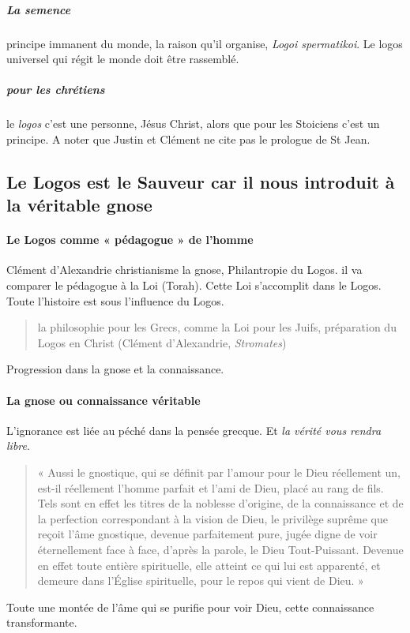       \subparagraph{La semence} principe immanent du monde, la raison qu'il organise, \emph{Logoi spermatikoi}. Le logos universel qui régit le monde doit être rassemblé.
      
      \subparagraph{pour les chrétiens} le \emph{logos} c'est une personne, Jésus Christ, alors que pour les Stoiciens c'est un principe. A noter que Justin et Clément ne cite pas le prologue de St Jean.
      
    
  
    
    \subsection{Le Logos est le Sauveur car il nous introduit à la véritable
    gnose}
    
      
      \paragraph{Le Logos comme « pédagogue » de l'homme} Clément d'Alexandrie christianisme la gnose, Philantropie du Logos. il va comparer le pédagogue à la Loi (Torah). Cette Loi s'accomplit dans le Logos. Toute l'histoire est sous l'influence du Logos.
      
      \begin{quote}
         la philosophie pour les Grecs, comme la Loi pour les Juifs, préparation du Logos en Christ (Clément d'Alexandrie, \textit{Stromates})
      \end{quote}
      Progression dans la gnose et la connaissance. 
      
    
      
      \paragraph{La gnose ou connaissance véritable}
      
      L'ignorance est liée au péché dans la pensée grecque. Et  \textit{la vérité vous rendra libre}. 
    
  \begin{quote}
      

« Aussi le gnostique, qui se définit par l'amour pour le Dieu réellement
un, est-il réellement l'homme parfait et l'ami de Dieu, placé au rang de
fils. Tels sont en effet les titres de la noblesse d'origine, de la
connaissance et de la perfection correspondant à la vision de Dieu, le
privilège suprême que reçoit l'âme gnostique, devenue parfaitement pure,
jugée digne de voir éternellement face à face, d'après la parole, le
Dieu Tout-Puissant. Devenue en effet toute entière spirituelle, elle
atteint ce qui lui est apparenté, et demeure dans l'Église spirituelle,
pour le repos qui vient de Dieu. »
  \end{quote}
Toute une montée de l'âme qui se purifie pour voir Dieu, cette connaissance transformante.

